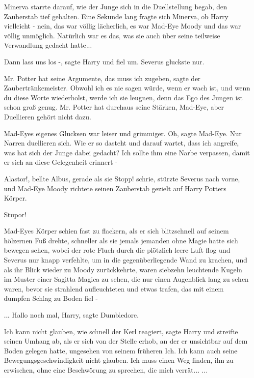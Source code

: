 Minerva starrte darauf, wie der Junge sich in die Duellstellung begab, den
Zauberstab tief gehalten. Eine Sekunde lang fragte sich Minerva, ob Harry
vielleicht - nein, das war völlig lächerlich, es war Mad-Eye Moody und das war
völlig unmöglich. Natürlich war es das, was sie auch über seine teilweise
Verwandlung gedacht hatte...

\glqq Dann lass uns los -\grqq{}, sagte Harry und fiel um. Severus gluckste nur.

\glqq Mr. Potter hat seine Argumente, das muss ich zugeben\grqq{}, sagte der
Zaubertränkemeister. \glqq Obwohl ich es nie sagen würde, wenn er wach ist, und
wenn du diese Worte wiederholst, werde ich sie leugnen, denn das Ego des Jungen
ist schon groß genug. Mr. Potter hat durchaus seine Stärken, Mad-Eye, aber
Duellieren gehört nicht dazu.\grqq{}

Mad-Eyes eigenes Glucksen war leiser und grimmiger. \glqq Oh\grqq{}, sagte
Mad-Eye. \glqq Nur Narren duellieren sich. Wie er so dasteht und darauf wartet,
dass ich angreife, was hat sich der Junge dabei gedacht? Ich sollte ihm eine
Narbe verpassen, damit er sich an diese Gelegenheit erinnert -\grqq{}

\glqq Alastor!\grqq{}, bellte Albus, gerade als sie \glqq Stopp!\grqq{} schrie,
stürzte Severus nach vorne, und Mad-Eye Moody richtete seinen Zauberstab gezielt
auf Harry Potters Körper.

\glqq Stupor!\grqq{}

Mad-Eyes Körper schien fast zu flackern, als er sich blitzschnell auf seinem
hölzernen Fuß drehte, schneller als sie jemals jemanden ohne Magie hatte sich
bewegen sehen, wobei der rote Fluch durch die plötzlich leere Luft flog und
Severus nur knapp verfehlte, um in die gegenüberliegende Wand zu krachen, und
als ihr Blick wieder zu Moody zurückkehrte, waren siebzehn leuchtende Kugeln im
Muster einer Sagitta Magica zu sehen, die nur einen Augenblick lang zu sehen
waren, bevor sie strahlend aufleuchteten und etwas trafen, das mit einem dumpfen
Schlag zu Boden fiel -

... \glqq Hallo noch mal, Harry\grqq{}, sagte Dumbledore.

\glqq Ich kann nicht glauben, wie schnell der Kerl reagiert\grqq{}, sagte Harry
und streifte seinen Umhang ab, als er sich von der Stelle erhob, an der er
unsichtbar auf dem Boden gelegen hatte, ungesehen von seinem früheren Ich. \glqq
Ich kann auch seine Bewegungsgeschwindigkeit nicht glauben. Ich muss einen Weg
finden, ihn zu erwischen, ohne eine Beschwörung zu sprechen, die mich
verrät...\grqq{} ...

